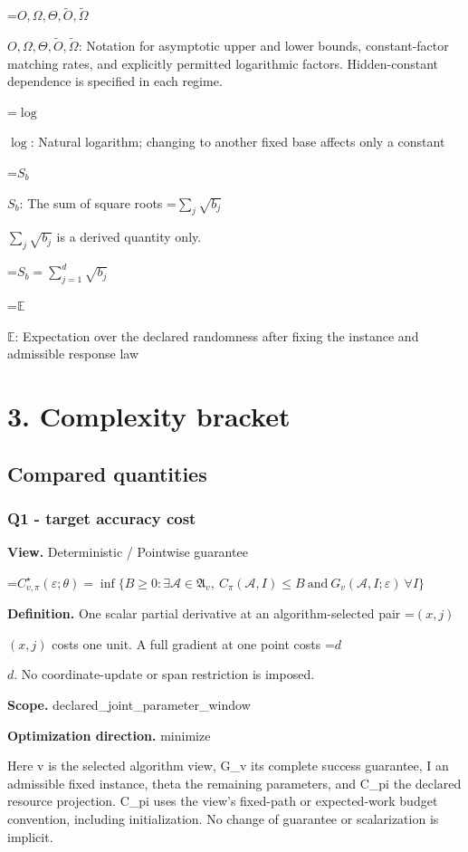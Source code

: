 \documentclass[10pt,a4paper]{article}
\newcommand{\AtlasMath}[1]{\par\begingroup\centering\setbox0=\hbox{$\displaystyle #1$}\ifdim\wd0>1.4\linewidth\typeout{ATLAS WIDE FORMULA: \the\wd0}\fi\ifdim\wd0>\linewidth\resizebox{\linewidth}{!}{\box0}\else\box0\fi\par\endgroup}
\newcommand{\AtlasInlineMath}[1]{\begingroup\setbox0=\hbox{$#1$}\ifdim\wd0>.4\linewidth\endgroup\AtlasMath{#1}\else\endgroup$#1$\fi}
\begin{document}
\AtlasInlineMath{O,\Omega,\Theta,\widetilde{O},\widetilde\Omega}: Notation for asymptotic upper and lower bounds, constant-factor matching rates, and explicitly permitted logarithmic factors. Hidden-constant dependence is specified in each regime.

\AtlasInlineMath{\log}: Natural logarithm; changing to another fixed base affects only a constant

\AtlasInlineMath{S_b}: The sum of square roots \AtlasInlineMath{\sum_j\sqrt{b_j}} is a derived quantity only.


\AtlasMath{S_b=\sum_{j=1}^d\sqrt{b_j}}


\AtlasInlineMath{\mathbb{E}}: Expectation over the declared randomness after fixing the instance and admissible response law

\section{3. Complexity bracket}
\subsection{Compared quantities}
\subsubsection{Q1 - target accuracy cost}
\textbf{View.} Deterministic / Pointwise guarantee

\AtlasMath{C^\star_{v,\pi}(\varepsilon;\theta)=\inf\{B\ge0:\exists\mathcal A\in\mathfrak A_v,\ C_\pi(\mathcal A,I)\le B\ \text{and}\ G_v(\mathcal A,I;\varepsilon)\ \forall I\}}
\textbf{Definition.} One scalar partial derivative at an algorithm-selected pair \AtlasInlineMath{(x,j)} costs one unit. A full gradient at one point costs \AtlasInlineMath{d}. No coordinate-update or span restriction is imposed.

\textbf{Scope.} declared\_\allowbreak{}joint\_\allowbreak{}parameter\_\allowbreak{}window

\textbf{Optimization direction.} minimize

Here v is the selected algorithm view, G\_\allowbreak{}v its complete success guarantee, I an admissible fixed instance, theta the remaining parameters, and C\_\allowbreak{}pi the declared resource projection. C\_\allowbreak{}pi uses the view's fixed-path or expected-work budget convention, including initialization. No change of guarantee or scalarization is implicit.
\end{document}

